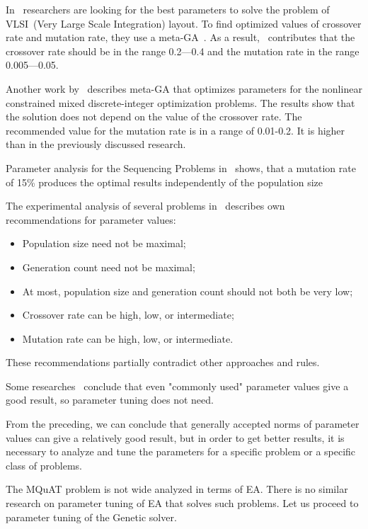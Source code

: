 In~\cite{shahookar1990genetic} researchers are looking for the best parameters to solve the problem of VLSI~(Very Large Scale Integration) layout. To find optimized values of crossover rate and mutation rate, they use a meta-GA~\cite{clune2005investigations}. As a result,~\cite{shahookar1990genetic} contributes that the crossover rate should be in the range 0.2—0.4 and the mutation rate in the range 0.005—0.05.

Another work by~\cite{wu1995genetic} describes meta-GA that optimizes parameters for the nonlinear constrained mixed discrete-integer optimization problems. The results show that the solution does not depend on the value of the crossover rate.
The recommended value for the mutation rate is in a range of 0.01-0.2. It is higher than in the previously discussed research.

Parameter analysis for the Sequencing Problems in~\cite{gockel1997influencing} shows, that a mutation
rate of 15\% produces the optimal results independently of the population size

The experimental analysis of several problems in~\cite{sipper2018investigating} describes own recommendations for parameter values: 

\begin{itemize}
	\item Population size need not be maximal;
	\item Generation count need not be maximal;
	\item At most, population size and generation count should not both be very
	low;
	\item Crossover rate can be high, low, or intermediate;
	\item Mutation rate can be high, low, or intermediate.
\end{itemize}

These recommendations partially contradict other approaches and rules.  

Some researches~\cite{smit2009comparing, arcuri2013parameter} conclude that even "commonly used" parameter values give a good result, so parameter tuning does not need.

From the preceding, we can conclude that generally accepted norms of parameter values can give a relatively good result, but in order to get better results, it is necessary to analyze and tune the parameters for a specific problem or a specific class of problems.

The MQuAT problem is not wide analyzed in terms of EA. There is no similar research on parameter tuning of EA that solves such problems.  Let us proceed to parameter tuning of the Genetic solver.

